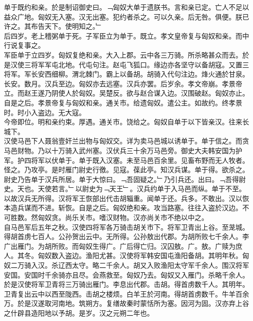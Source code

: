 \documentclass{zhvt-classic}
\begin{document}
\hspace*{2em}单于既约和亲。於是制诏御史曰。﹁匈奴大单于遗朕书。言和亲已定。亡人不足以益众广地。匈奴无入塞。汉无出塞。犯约者杀之。可以久亲。后无咎。俱便。朕已许之。其布告天下。使明知之。﹂\\
\hspace*{2em}后四岁。老上稽粥单于死。子军臣立为单于。既立。孝文皇帝复与匈奴和亲。而中行说复事之。\\
\hspace*{2em}军臣单于立四岁。匈奴复绝和亲。大入上郡。云中各三万骑。所杀略甚众而去。於是汉使三将军军屯北地。代屯句注。赵屯飞狐口。缘边亦各坚守以备胡寇。又置三将军。军长安西细柳。渭北棘门。霸上以备胡。胡骑入代句注边。烽火通於甘泉。长安。数月。汉兵至边。匈奴亦去远塞。汉兵亦罢。后岁余。孝文帝崩。孝景帝立。而赵王遂乃阴使人於匈奴。吴楚反。欲与赵合谋入边。汉围破赵。匈奴亦止。自是之后。孝景帝复与匈奴和亲。通关市。给遗匈奴。遣公主。如故约。终孝景时。时小入盗边。无大寇。\\
\hspace*{2em}今帝即位。明和亲约束。厚遇。通关市。饶给之。匈奴自单于以下皆亲汉。往来长城下。\\
\hspace*{2em}汉使马邑下人聂翁壹奸兰出物与匈奴交。详为卖马邑城以诱单于。单于信之。而贪马邑财物。乃以十万骑入武州塞。汉伏兵三十余万马邑旁。御史大夫韩安国为护军。护四将军以伏单于。单于既入汉塞。未至马邑百余里。见畜布野而无人牧者。怪之。乃攻亭。是时雁门尉史行徼。见寇。葆此亭。知汉兵谋。单于得。欲杀之。尉史乃告单于汉兵所居。单于大惊曰。﹁吾固疑之。﹂乃引兵还。出曰。﹁吾得尉史。天也。天使若言。﹂以尉史为﹁天王﹂。汉兵约单于入马邑而纵。单于不至。以故汉兵无所得。汉将军王恢部出代击胡辎重。闻单于还。兵多。不敢出。汉以恢本造兵谋而不进。斩恢。自是之后。匈奴绝和亲。攻当路塞。往往入盗於汉边。不可胜数。然匈奴贪。尚乐关市。嗜汉财物。汉亦尚关市不绝以中之。\\
\hspace*{2em}自马邑军后五年之秋。汉使四将军各万骑击胡关市下。将军卫青出上谷。至茏城。得胡首虏七百人。公孙贺出云中。无所得。公孙敖出代郡。为胡所败七千余人。李广出雁门。为胡所败。而匈奴生得广。广后得亡归。汉囚敖。广。敖。广赎为庶人。其冬。匈奴数入盗边。渔阳尤甚。汉使将军韩安国屯渔阳备胡。其明年秋。匈奴二万骑入汉。杀辽西太守。略二千余人。胡又入败渔阳太守军千余人。围汉将军安国。安国时千余骑亦且尽。会燕救至。匈奴乃去。匈奴又入雁门。杀略千余人。於是汉使将军卫青将三万骑出雁门。李息出代郡。击胡。得首虏数千人。其明年。卫青复出云中以西至陇西。击胡之楼烦。白羊王於河南。得胡首虏数千。牛羊百余万。於是汉遂取河南地。筑朔方。复缮故秦时蒙恬所为塞。因河为固。汉亦弃上谷之什辟县造阳地以予胡。是岁。汉之元朔二年也。\\
\end{document}
